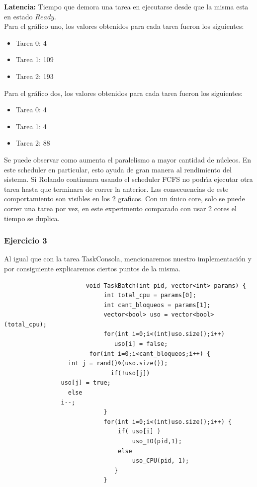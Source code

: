 \textbf{Latencia:} Tiempo que demora una tarea en ejecutarse desde que la misma esta en estado $Ready$.\\

\indent Para el gr\'{a}fico uno, los valores obtenidos para cada tarea fueron los siguientes:\\

\begin{itemize}
 \item Tarea 0: 4
 \item Tarea 1: 109
 \item Tarea 2: 193
\end{itemize}

\indent Para el gr\'{a}fico dos, los valores obtenidos para cada tarea fueron los siguientes:\\

\begin{itemize}
 \item Tarea 0: 4
 \item Tarea 1: 4
 \item Tarea 2: 88
\end{itemize}

\indent Se puede observar como aumenta el paralelismo a mayor cantidad de núcleos. 
En este scheduler en particular, esto ayuda de gran manera al rendimiento del sistema. Si Rolando 
continuara usando el scheduler FCFS no podr\'{\i}a ejecutar otra tarea hasta que terminara de correr 
la anterior. Las consecuencias de este comportamiento son visibles en los 2 graficos. Con un \'{u}nico core, 
solo se puede correr una tarea por vez, en este experimento comparado con usar 2 cores el tiempo se duplica.\\

\subsubsection[Resolución Ejercicio 3]{Ejercicio 3}

\indent Al igual que con la tarea TaskConsola, mencionaremos nuestro implementación y por consiguiente  
explicaremos ciertos puntos de la misma.\\
 \begin{verbatim}
                       void TaskBatch(int pid, vector<int> params) {
                            int total_cpu = params[0];
                            int cant_bloqueos = params[1];
                            vector<bool> uso = vector<bool>(total_cpu);
                            for(int i=0;i<(int)uso.size();i++) 
                               uso[i] = false;
	                    for(int i=0;i<cant_bloqueos;i++) {
			      int j = rand()%(uso.size());
                              if(!uso[j])
				uso[j] = true;
			      else
				i--; 
                            }
                            for(int i=0;i<(int)uso.size();i++) {
                                if( uso[i] )
                                    uso_IO(pid,1); 
                                else
                                    uso_CPU(pid, 1); 
                               }
                            }
 \end{verbatim}


